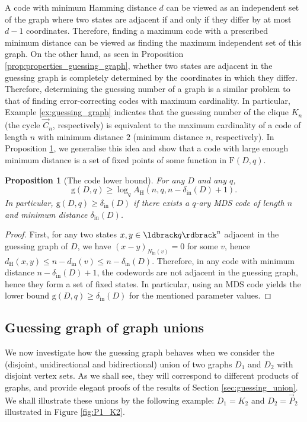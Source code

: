 \documentclass[a4paper, 11pt]{book}
\numberwithin{equation}{section}
\theoremstyle{plain}
\newtheorem{proposition}[equation]	{Proposition}
\newcommand{\neighbourhood}{N}
\newcommand{\degree}{d}
\newcommand{\dMin}{\delta}
\newcommand{\inn}[1]{#1_\mathrm{in}}
\newcommand{\NIn}{\inn{\neighbourhood}}
\newcommand{\dIn}{\inn{\degree}}
\newcommand{\dInMin}{\inn{\dMin}}
\newcommand{\functions}{\mathrm{F}}
\newcommand{\guessing}{\mathrm{g}}
\newcommand{\dH}{d_\mathrm{H}}
\newcommand{\AH}{A_\mathrm{H}}
\renewcommand{\(}{\ldbrack}
\renewcommand{\)}{\rdbrack}
\begin{document}
A code with minimum Hamming distance $d$ can be viewed as an independent set of the graph where two states are adjacent if and only if they differ by at most $d-1$ coordinates. Therefore, finding a maximum code with a prescribed minimum distance can be viewed as finding the maximum independent set of this graph. On the other hand, as seen in Proposition \ref{prop:properties_guessing_graph}, whether two states are adjacent in the guessing graph is completely determined by the coordinates in which they differ. Therefore, determining the guessing number of a graph is a similar problem to that of finding error-correcting codes with maximum cardinality. In particular, Example \ref{ex:guessing_graph} indicates that the guessing number of the clique $K_n$ (the cycle $\vec{C}_n$, respectively) is equivalent to the maximum cardinality of a code of length $n$ with minimum distance $2$ (minimum distance $n$, respectively). In Proposition \ref{prop:bound_code}, we generalise this idea and show that a code with large enough minimum distance is a set of fixed points of some function in $\functions(D,q)$.



\begin{proposition}[The code lower bound] \label{prop:bound_code}
For any $D$ and any $q$,
\[
	\guessing(D,q) \ge \log_q \AH(n, q, n-\dInMin(D) + 1).
\]
In particular, $\guessing(D,q) \ge \dInMin(D)$ if there exists a $q$-ary MDS code of length $n$ and minimum distance $\dInMin(D)$.
\end{proposition}

\begin{proof}
First, for any two states $x,y \in \(q\)^n$ adjacent in the guessing graph of $D$, we have $(x-y)_{\NIn(v)} = 0$ for some $v$, hence $\dH(x,y) \le n - \dIn(v) \le n- \dInMin(D)$. Therefore, in any code with minimum distance $n-\dInMin(D) + 1$, the codewords are not adjacent in the guessing graph, hence they form a set of fixed states. In particular, using an MDS code yields the lower bound $\guessing(D,q) \ge \dInMin(D)$ for the mentioned parameter values.
\end{proof}






\subsection{Guessing graph of graph unions} \label{sec:guessing_graph_graph_union}

We now investigate how the guessing graph behaves when we consider the (disjoint, unidirectional and bidirectional) union of two graphs $D_1$ and $D_2$ with disjoint vertex sets. As we shall see, they will correspond to different products of graphs, and provide elegant proofs of the results of Section \ref{sec:guessing_union}. We shall illustrate these unions by the following example: $D_1 = K_2$ and $D_2 = \vec{P}_2$ illustrated in Figure \ref{fig:P1_K2}.
\end{document}
